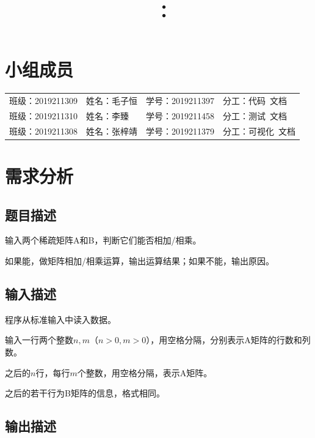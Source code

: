 \documentclass{article}
\title{\hmwkClass\ ：\hmwkTitle}
\author{\hmwkAuthorName}
\begin{document}
\maketitle

\section*{小组成员}

\setlength{\tabcolsep}{9mm}
{
    \begin{table}[htbp]
        \centering
        \begin{tabular}{llll}
            班级：2019211309 & 姓名：毛子恒 & 学号：2019211397 & 分工：代码\ 文档   \\

            班级：2019211310 & 姓名：李臻   & 学号：2019211458 & 分工：测试\ 文档   \\

            班级：2019211308 & 姓名：张梓靖 & 学号：2019211379 & 分工：可视化\ 文档 \\
        \end{tabular}
    \end{table}
}

\tableofcontents
\newpage

\section{需求分析}

\subsection{题目描述}

输入两个稀疏矩阵A和B，判断它们能否相加/相乘。

如果能，做矩阵相加/相乘运算，输出运算结果；如果不能，输出原因。

\subsection{输入描述}

程序从标准输入中读入数据。

输入一行两个整数$n,m$（$n>0,m>0$），用空格分隔，分别表示A矩阵的行数和列数。

之后的$n$行，每行$m$个整数，用空格分隔，表示A矩阵。

之后的若干行为B矩阵的信息，格式相同。

\subsection{输出描述}
\end{document}
